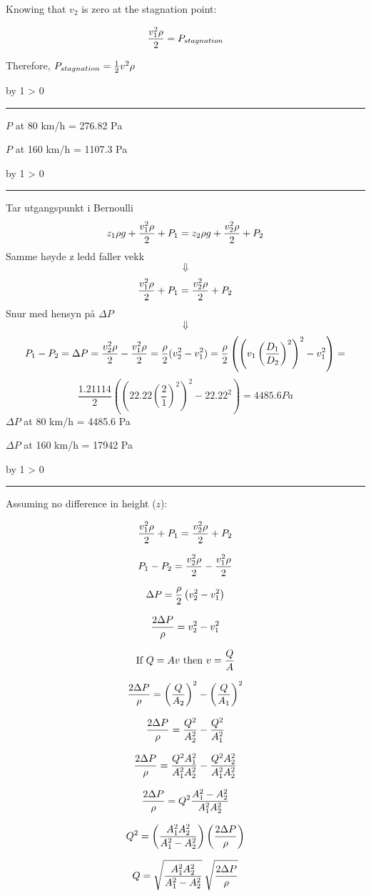 \documentclass[12pt,a4paper]{article}
\def\svar{
           \advance\answnum by 1
           \ifnum \answnum > 0
                \hrule
                \vskip 3pt
                \leftline{Svar \the\answnum}
                \vskip 3pt \fi}
\begin{document}
Knowing that $v_2$ is zero at the stagnation point:

$${v_1^2 \rho \over 2} = P_{stagnation}$$

\vskip 10pt

Therefore, $P_{stagnation} = {1 \over 2} v^2 \rho$


\vskip 10pt \filbreak 
\svar{} 

$P$ at 80 km/h = 276.82 Pa

\vskip 10pt

$P$ at 160 km/h = 1107.3 Pa

\vskip 10pt \filbreak 
\svar{} 
Tar utgangspunkt i Bernoulli
$$z_1 \rho g + {v_1^2 \rho \over 2} + P_1 = z_2 \rho g + {v_2^2 \rho \over 2} + P_2$$
Samme høyde z ledd faller vekk$$ \Downarrow $$
$${v_1^2 \rho \over 2} + P_1 = {v_2^2 \rho \over 2} + P_2$$
Snur med hensyn på $\Delta P$ $$ \Downarrow $$
$$ P_1-P_2=\Delta P = {v_2^2 \rho \over 2} -{v_1^2 \rho \over 2}=\frac{\rho}{2}(v_2^2-v_1^2)=\frac{\rho}{2}\left(\left(v_1 \left(\frac{D_1}{D_2}\right)^2\right)^2-v_1^2\right)= $$
$$\frac{1.21114}{2}\left(\left(22.22 \left(\frac{2}{1}\right)^2\right)^2-22.22^2\right)=4485.6 Pa $$
$\Delta P$ at 80 km/h = 4485.6 Pa 
\vskip 10pt

$\Delta P$ at 160 km/h =  17942 Pa

\vskip 10pt \filbreak 
\svar{} 

Assuming no difference in height ($z$):

$${v_1^2 \rho \over 2} + P_1 = {v_2^2 \rho \over 2} + P_2$$

$$P_1 - P_2 = {v_2^2 \rho \over 2} - {v_1^2 \rho \over 2}$$

$$\Delta P = {\rho \over 2} \left( v_2^2 - v_1^2 \right)$$

$${2 \Delta P \over \rho}= v_2^2 - v_1^2$$

$$\hbox{If } Q = Av \hbox{ then } v = {Q \over A}$$

$${2 \Delta P \over \rho} = \left({Q \over A_2}\right)^2 - \left({Q \over A_1}\right)^2$$

$${2 \Delta P \over \rho} = {Q^2 \over A_2^2} - {Q^2 \over A_1^2}$$

$${2 \Delta P \over \rho} = {Q^2 A_1^2 \over A_1^2 A_2^2} - {Q^2 A_2^2 \over A_1^2 A_2^2}$$

$${2 \Delta P \over \rho} = Q^2 {A_1^2 - A_2^2 \over A_1^2 A_2^2}$$

$$Q^2 = \left({A_1^2 A_2^2 \over A_1^2 - A_2^2}\right) \left({2 \Delta P \over \rho}\right)$$

$$Q = \sqrt{A_1^2 A_2^2 \over A_1^2 - A_2^2} \> \sqrt{2 \Delta P \over \rho}$$
\end{document}
